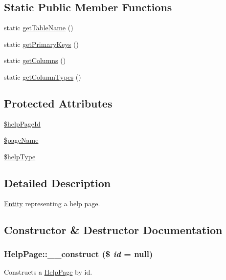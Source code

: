\subsection*{Static Public Member Functions}
\begin{DoxyCompactItemize}
\item 
static \hyperlink{classHelpPage_a28380b31bea21840c86ab69c49cad198}{getTableName} ()
\item 
static \hyperlink{classHelpPage_aad190998d886f0c38ecbb056f32c2b96}{getPrimaryKeys} ()
\item 
static \hyperlink{classHelpPage_a56d2e02b9490b1834fadd39fdab3e312}{getColumns} ()
\item 
static \hyperlink{classHelpPage_abf83884baba4ef17e2d9f2510661f1dd}{getColumnTypes} ()
\end{DoxyCompactItemize}
\subsection*{Protected Attributes}
\begin{DoxyCompactItemize}
\item 
\hyperlink{classHelpPage_a888d439b8b0c556098a7819d8fa2c94c}{\$helpPageId}
\item 
\hyperlink{classHelpPage_ac4837216da4af2d7d266efd4767a147c}{\$pageName}
\item 
\hyperlink{classHelpPage_a9c1a900e5bbdeaa7ee36e408fe5b82a3}{\$helpType}
\end{DoxyCompactItemize}


\subsection{Detailed Description}
\hyperlink{classEntity}{Entity} representing a help page. 

\subsection{Constructor \& Destructor Documentation}
\hypertarget{classHelpPage_a46a830bfff2f6eb43d2dfe6475eb47af}{
\subsubsection[{\_\-\_\-construct}]{\setlength{\rightskip}{0pt plus 5cm}HelpPage::\_\-\_\-construct (\$ {\em id} = {\ttfamily null})}}
\label{classHelpPage_a46a830bfff2f6eb43d2dfe6475eb47af}
Constructs a \hyperlink{classHelpPage}{HelpPage} by id.


